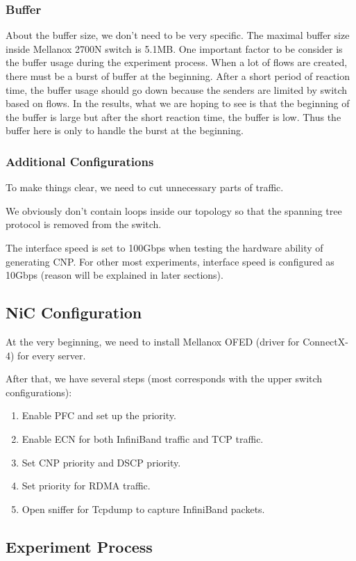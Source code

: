 \documentclass{article}
\begin{document}
\subsubsection{Buffer}
About the buffer size, we don't need to be very specific. The maximal buffer size inside Mellanox 2700N switch is 5.1MB.
One important factor to be consider is the buffer usage during the experiment process.
When a lot of flows are created, there must be a burst of buffer at the beginning.
After a short period of reaction time, the buffer usage should go down because the senders are limited by switch based on flows.
In the results, what we are hoping to see is that the beginning of the buffer is large but after the short reaction time, the buffer is low.
Thus the buffer here is only to handle the burst at the beginning.

\subsubsection{Additional Configurations}
To make things clear, we need to cut unnecessary parts of traffic.

We obviously don't contain loops inside our topology so that the spanning tree protocol is removed from the switch.

The interface speed is set to 100Gbps when testing the hardware ability of generating CNP.
For other most experiments, interface speed is configured as 10Gbps (reason will be explained in later sections).

\subsection{NiC Configuration}
At the very beginning, we need to install Mellanox OFED (driver for ConnectX-4) for every server.

After that, we have several steps (most corresponds with the upper switch configurations):
\begin{enumerate}
	\item Enable PFC and set up the priority.
	\item Enable ECN for both InfiniBand traffic and TCP traffic.
	\item Set CNP priority and DSCP priority.
	\item Set priority for RDMA traffic.
	\item Open sniffer for Tcpdump to capture InfiniBand packets.
\end{enumerate}

\subsection{Experiment Process}
\end{document}
